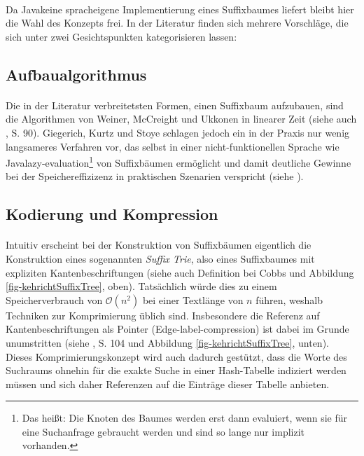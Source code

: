 \paragraph{} Da Java\texttrademark keine spracheigene Implementierung eines Suffixbaumes liefert bleibt hier die Wahl des Konzepts frei. In der Literatur finden sich mehrere Vorschläge, die sich unter zwei Gesichtspunkten kategorisieren lassen:

\subsection{Aufbaualgorithmus}

\paragraph{} Die in der Literatur verbreitetsten Formen, einen Suffixbaum aufzubauen, sind die Algorithmen von Weiner, McCreight und Ukkonen in linearer Zeit (siehe auch \cite{gusfield}, S. 90). Giegerich, Kurtz und Stoye schlagen jedoch ein in der Praxis nur wenig langsameres Verfahren vor, das selbst in einer nicht-funktionellen Sprache wie Java\texttrademark lazy-evaluation\footnote{Das heißt: Die Knoten des Baumes werden erst dann evaluiert, wenn sie für eine Suchanfrage gebraucht werden und sind so lange nur implizit vorhanden.} von Suffixbäumen ermöglicht und damit deutliche Gewinne bei der Speichereffizizenz in praktischen Szenarien verspricht (siehe \cite{lazyTrees}).

\subsection{Kodierung und Kompression}

\paragraph{} Intuitiv erscheint bei der Konstruktion von Suffixbäumen eigentlich die Konstruktion eines sogenannten \textit{Suffix Trie}, also eines Suffixbaumes mit expliziten Kantenbeschriftungen (siehe auch  Definition bei Cobbs \cite{approxTreesCobbs} und Abbildung \ref{fig-kehrichtSuffixTree}, oben). Tatsächlich würde dies zu einem Speicherverbrauch von $\mathcal{O}
(n^2)$ bei einer Textlänge von $n$ führen, weshalb Techniken zur Komprimierung üblich sind. Insbesondere die Referenz auf Kantenbeschriftungen als Pointer (Edge-label-compression) ist dabei im Grunde unumstritten (siehe \cite{gusfield}, S. 104 und Abbildung \ref{fig-kehrichtSuffixTree}, unten).
Dieses Komprimierungskonzept wird auch dadurch gestützt, dass die Worte des Suchraums ohnehin für die exakte Suche in einer Hash-Tabelle indiziert werden müssen und sich daher Referenzen auf die Einträge dieser Tabelle anbieten.
